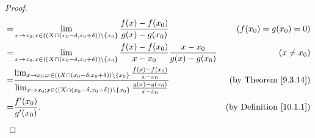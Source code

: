 \begin{proof}
\begin{align*}
        = & \lim_{x \to x_0 ; x \in ((X \cap (x_0 - \delta, x_0 + \delta)) \setminus \{x_0\}} \frac{f(x) - f(x_0)}{g(x) - g(x_0)}                                                                                                                   & (f(x_0) = g(x_0) = 0)               \\
        = & \lim_{x \to x_0 ; x \in ((X \cap (x_0 - \delta, x_0 + \delta)) \setminus \{x_0\}} \frac{f(x) - f(x_0)}{x - x_0} \frac{x - x_0}{g(x) - g(x_0)}                                                                                           & (x \neq x_0)                        \\
        = & \frac{\lim_{x \to x_0 ; x \in ((X \cap (x_0 - \delta, x_0 + \delta)) \setminus \{x_0\}} \frac{f(x) - f(x_0)}{x - x_0}}{\lim_{x \to x_0 ; x \in ((X \cap (x_0 - \delta, x_0 + \delta)) \setminus \{x_0\}} \frac{g(x) - g(x_0)}{x - x_0}} & \text{(by Theorem \ref{9.3.14})}    \\
        = & \frac{f'(x_0)}{g'(x_0)}.                                                                                                                                                                                                                & \text{(by Definition \ref{10.1.1})}
    \end{align*}
\end{proof}
